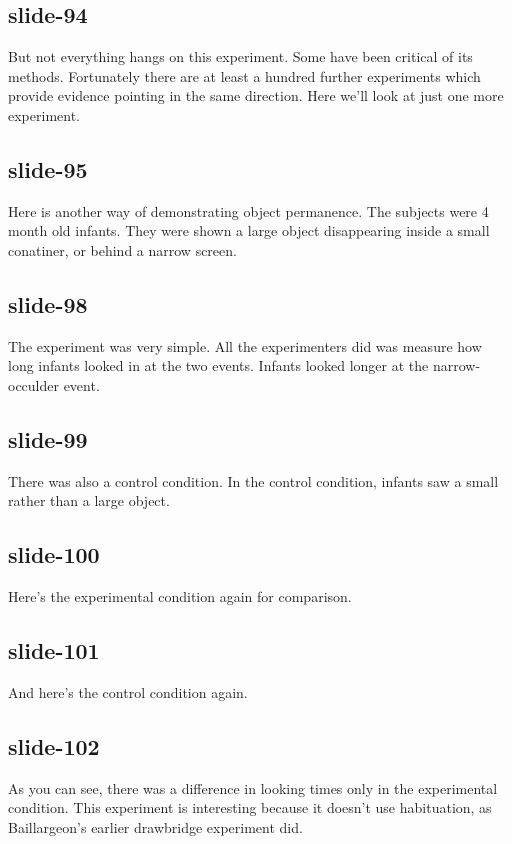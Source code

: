 \documentclass[12pt,\papersize]{extarticle}
\begin{document}
 
\subsection{slide-94}
But not everything hangs on this experiment.
Some have been critical of its methods.
Fortunately there are at least a hundred further experiments which provide evidence pointing in the same direction.
Here we'll look at just one more experiment.
 
 
\subsection{slide-95}
Here is another way of demonstrating object permanence.
The subjects were 4 month old infants.
They were shown a large object disappearing inside a small conatiner, or behind a narrow screen.
 
 
\subsection{slide-98}
The experiment was very simple.
All the experimenters did was measure how long infants looked in at the two events.
Infants looked longer at the narrow-occulder event.
 
 
\subsection{slide-99}
There was also a control condition.
In the control condition, infants saw a small rather than a large object.
 
 
\subsection{slide-100}
Here’s the experimental condition again for comparison.
 
 
\subsection{slide-101}
And here's the control condition again.
 
 
\subsection{slide-102}
As you can see, there was a difference in looking times only in the experimental condition.
This experiment is interesting because it doesn't use habituation, as Baillargeon's earlier drawbridge experiment did.
 
\end{document}
